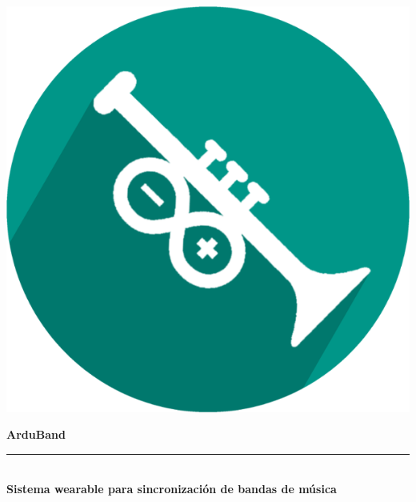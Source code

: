 \begin{titlepage}


\setlength{\centeroffset}{-0.5\oddsidemargin}
\addtolength{\centeroffset}{0.5\evensidemargin}
\thispagestyle{empty}

\noindent\hspace*{\centeroffset}\begin{minipage}{\textwidth}

\centering

\includegraphics{imagenes/logo.png}
 \vspace{0.5cm}


{\Huge\bfseries ArduBand\\
}
\noindent\rule[-1ex]{\textwidth}{3pt}\\[3.5ex]
{\large\bfseries Sistema wearable para sincronización de bandas de música\\[4cm]}
\end{minipage}

\vspace{3cm}
\noindent\hspace*{\centeroffset}\begin{minipage}{\textwidth}
\centering


\end{minipage}
\end{titlepage}
